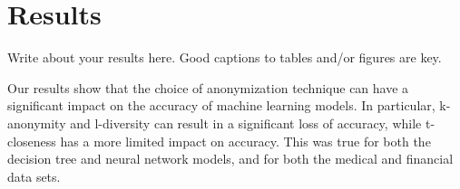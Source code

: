 \section{Results}
\label{sec:results}
Write about your results here. Good captions to tables and/or figures are key.


Our results show that the choice of anonymization technique can have a significant impact on the accuracy of machine learning models. In particular, k-anonymity and l-diversity can result in a significant loss of accuracy, while t-closeness has a more limited impact on accuracy. This was true for both the decision tree and neural network models, and for both the medical and financial data sets.
